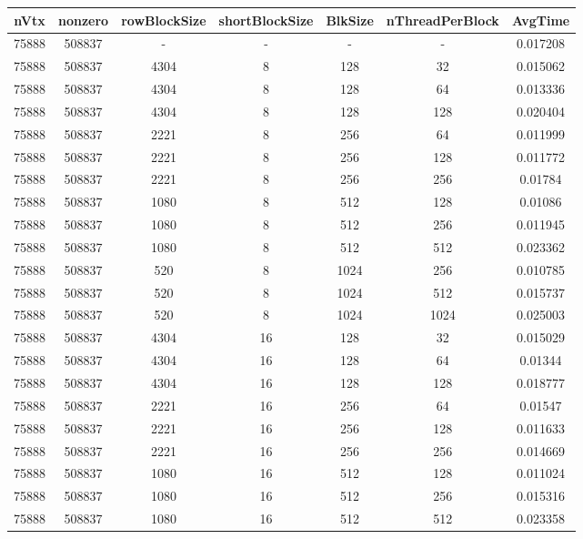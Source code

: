 \documentclass[9pt]{article}
\begin{document}
\SetBgPosition{0.25cm,-5.0cm}
\begin{tabular}{|c|c|c|c|c|c|c| }  
\hline
nVtx  & nonzero  & rowBlockSize  & shortBlockSize  & BlkSize  & nThreadPerBlock  & AvgTime \\
\hline
75888  & 508837  &  -  & -  & -  & -  &0.017208 \\
\hline
75888  & 508837  & 4304  & 8  & 128  & 32  & 0.015062 \\
\hline
75888  & 508837  & 4304  & 8  & 128  & 64  & 0.013336 \\
\hline
75888  & 508837  & 4304  & 8  & 128  & 128  & 0.020404 \\
\hline
75888  & 508837  & 2221  & 8  & 256  & 64  & 0.011999 \\
\hline
75888  & 508837  & 2221  & 8  & 256  & 128  & 0.011772 \\
\hline
75888  & 508837  & 2221  & 8  & 256  & 256  & 0.01784 \\
\hline
75888  & 508837  & 1080  & 8  & 512  & 128  & 0.01086 \\
\hline
75888  & 508837  & 1080  & 8  & 512  & 256  & 0.011945 \\
\hline
75888  & 508837  & 1080  & 8  & 512  & 512  & 0.023362 \\
\hline
75888  & 508837  & 520  & 8  & 1024  & 256  & 0.010785 \\
\hline
75888  & 508837  & 520  & 8  & 1024  & 512  & 0.015737 \\
\hline
75888  & 508837  & 520  & 8  & 1024  & 1024  & 0.025003 \\
\hline
75888  & 508837  & 4304  & 16  & 128  & 32  & 0.015029 \\
\hline
75888  & 508837  & 4304  & 16  & 128  & 64  & 0.01344 \\
\hline
75888  & 508837  & 4304  & 16  & 128  & 128  & 0.018777 \\
\hline
75888  & 508837  & 2221  & 16  & 256  & 64  & 0.01547 \\
\hline
75888  & 508837  & 2221  & 16  & 256  & 128  & 0.011633 \\
\hline
75888  & 508837  & 2221  & 16  & 256  & 256  & 0.014669 \\
\hline
75888  & 508837  & 1080  & 16  & 512  & 128  & 0.011024 \\
\hline
75888  & 508837  & 1080  & 16  & 512  & 256  & 0.015316 \\
\hline
75888  & 508837  & 1080  & 16  & 512  & 512  & 0.023358 \\

\end{tabular}
\end{document}
